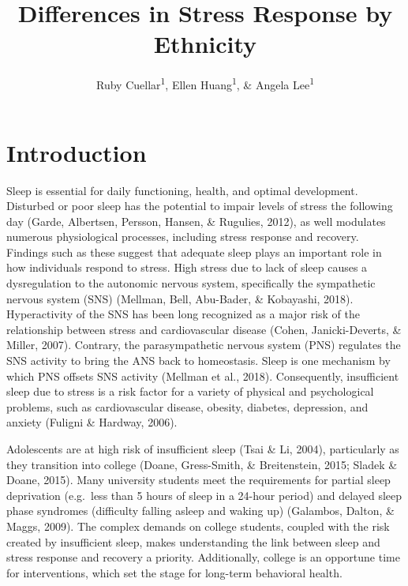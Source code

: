 \documentclass[man, fleqn, noextraspace]{apa6}
\title{Differences in Stress Response by Ethnicity}
\author{Ruby Cuellar\textsuperscript{1}, Ellen Huang\textsuperscript{1}, \& Angela Lee\textsuperscript{1}}
\date{}
\begin{document}
\maketitle

\hypertarget{introduction}{%
\section{Introduction}\label{introduction}}

Sleep is essential for daily functioning, health, and optimal development. Disturbed or poor sleep has the potential to impair levels of stress the following day (Garde, Albertsen, Persson, Hansen, \& Rugulies, 2012), as well modulates numerous physiological processes, including stress response and recovery. Findings such as these suggest that adequate sleep plays an important role in how individuals respond to stress. High stress due to lack of sleep causes a dysregulation to the autonomic nervous system, specifically the sympathetic nervous system (SNS) (Mellman, Bell, Abu-Bader, \& Kobayashi, 2018). Hyperactivity of the SNS has been long recognized as a major risk of the relationship between stress and cardiovascular disease (Cohen, Janicki-Deverts, \& Miller, 2007). Contrary, the parasympathetic nervous system (PNS) regulates the SNS activity to bring the ANS back to homeostasis. Sleep is one mechanism by which PNS offsets SNS activity (Mellman et al., 2018). Consequently, insufficient sleep due to stress is a risk factor for a variety of physical and psychological problems, such as cardiovascular disease, obesity, diabetes, depression, and anxiety (Fuligni \& Hardway, 2006).

Adolescents are at high risk of insufficient sleep (Tsai \& Li, 2004), particularly as they transition into college (Doane, Gress-Smith, \& Breitenstein, 2015; Sladek \& Doane, 2015). Many university students meet the requirements for partial sleep deprivation (e.g.~less than 5 hours of sleep in a 24-hour period) and delayed sleep phase syndromes (difficulty falling asleep and waking up) (Galambos, Dalton, \& Maggs, 2009). The complex demands on college students, coupled with the risk created by insufficient sleep, makes understanding the link between sleep and stress response and recovery a priority. Additionally, college is an opportune time for interventions, which set the stage for long-term behavioral health.
\end{document}

